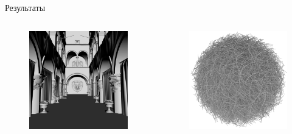 \begin{frame}[t]{Результаты}
\begin{columns}
        \begin{figure}
            \includegraphics[keepaspectratio, width=\textwidth]{res/sponza.png}
        \end{figure}
        \begin{figure}
            \includegraphics[keepaspectratio, width=\textwidth]{res/hairball.png}
        \end{figure}


\end{columns}
\end{frame}
